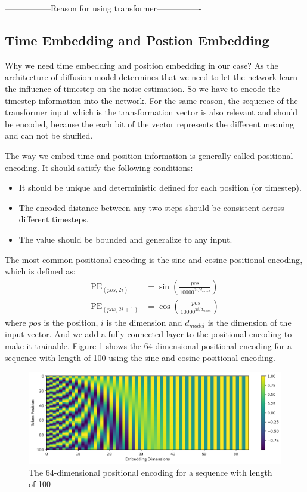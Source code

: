 \documentclass[12pt,DIV14,BCOR12mm,a4paper,footinclude=false,headinclude,parskip=half-,twoside,openright,cleardoublepage=empty,toc=index,bibliography=totoc,listof=totoc]{scrreprt}
\numberwithin{equation}{chapter}
\begin{document}
-----------------Reason for using transformer----------------

\subsection{Time Embedding and Postion Embedding}
Why we need time embedding and position embedding in our case? As the architecture of diffusion model determines that we need to let the network learn the influence of timestep on the noise estimation. So we have to encode the timestep information into the network. For the same reason, the sequence of the transformer input which is the transformation vector is also relevant and should be encoded, because the each bit of the vector represents the different meaning and can not be shuffled.

The way we embed time and position information is generally called positional encoding. It should satisfy the following conditions\cite{kazemnejad2019:pencoding}:
\begin{itemize}
  \item It should be unique and deterministic defined for each position (or timestep).
  \item The encoded distance between any two steps should be consistent across different timesteps.
  \item The value should be bounded and generalize to any input.
\end{itemize}
The most common positional encoding is the sine and cosine positional encoding\cite{vaswani2023attention}, which is defined as:
\begin{align}
  \text{PE}_{(pos, 2i)} &= \sin\left(\frac{pos}{10000^{2i/d_{model}}}\right)\\
  \text{PE}_{(pos, 2i+1)} &= \cos\left(\frac{pos}{10000^{2i/d_{model}}}\right)
\end{align}
where $pos$ is the position, $i$ is the dimension and $d_{model}$ is the dimension of the input vector. And we add a fully connected layer to the positional encoding to make it trainable. Figure \ref{img:pe} shows the 64-dimensional positional encoding for a sequence with length of 100 using the sine and cosine positional encoding.
\begin{figure}[h]
	\centering
	\includegraphics[scale=.65]{img/pe.png}
	\caption{The 64-dimensional positional encoding for a sequence with length of 100}
	\label{img:pe}
\end{figure}
\end{document}
